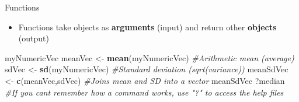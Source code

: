 \documentclass[
  ignorenonframetext,
  aspectratio=169]{beamer}
\newenvironment{Shaded}{\begin{snugshade}}{\end{snugshade}}
\newcommand{\CommentTok}[1]{\textcolor[rgb]{0.56,0.35,0.01}{\textit{#1}}}
\newcommand{\FunctionTok}[1]{\textcolor[rgb]{0.13,0.29,0.53}{\textbf{#1}}}
\newcommand{\NormalTok}[1]{#1}
\newcommand{\OtherTok}[1]{\textcolor[rgb]{0.56,0.35,0.01}{#1}}
\providecommand{\tightlist}{%
  \setlength{\itemsep}{0pt}\setlength{\parskip}{0pt}}
\begin{document}
\begin{frame}[fragile]{Functions}
\protect\hypertarget{functions}{}
\begin{itemize}[<+->]
\tightlist
\item
  Functions take objects as \textbf{arguments} (input) and return other
  \textbf{objects} (output)
\end{itemize}

\footnotesize

\begin{Shaded}
\begin{Highlighting}[]
\NormalTok{myNumericVec}
\NormalTok{meanVec }\OtherTok{\textless{}{-}} \FunctionTok{mean}\NormalTok{(myNumericVec) }\CommentTok{\#Arithmetic mean (average)}
\NormalTok{sdVec }\OtherTok{\textless{}{-}} \FunctionTok{sd}\NormalTok{(myNumericVec) }\CommentTok{\#Standard deviation (sqrt(variance))}
\NormalTok{meanSdVec }\OtherTok{\textless{}{-}} \FunctionTok{c}\NormalTok{(meanVec,sdVec) }\CommentTok{\#Joins mean and SD into a vector}
\NormalTok{meanSdVec}
\NormalTok{?median }\CommentTok{\#If you can\textquotesingle{}t remember how a command works, use "?" to access the help files}
\end{Highlighting}
\end{Shaded}

\normalsize
\end{frame}
\end{document}
